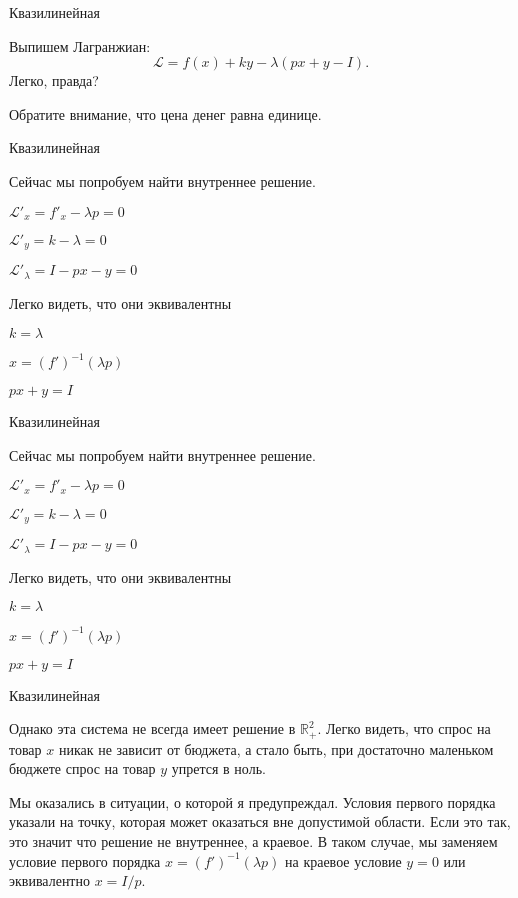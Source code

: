 \documentclass{beamer}
\begin{document}
\begin{frame}{Квазилинейная}

Выпишем Лагранжиан:
$$\mathcal{L} = f(x) + k y - \lambda (px + y - I).$$ 
Легко, правда?

Обратите внимание, что цена денег равна единице.

\end{frame}

\begin{frame}{Квазилинейная}

Сейчас мы попробуем найти внутреннее решение.

$\mathcal{L}'_x = f'_x - \lambda p = 0$

$\mathcal{L}'_y = k - \lambda = 0$

$\mathcal{L}'_{\lambda} = I - p x - y= 0$

Легко видеть, что они эквивалентны

$k = \lambda$

$x = (f')^{-1}(\lambda p)$

$px + y = I$

\end{frame}

\begin{frame}{Квазилинейная}

Сейчас мы попробуем найти внутреннее решение.

$\mathcal{L}'_x = f'_x - \lambda p = 0$

$\mathcal{L}'_y = k - \lambda = 0$

$\mathcal{L}'_{\lambda} = I - p x - y= 0$

Легко видеть, что они эквивалентны

$k = \lambda$

$x = (f')^{-1}(\lambda p)$

$px + y = I$

\end{frame}

\begin{frame}{Квазилинейная}

Однако эта система не всегда имеет решение в $\mathbb{R}^2_{+}$. Легко видеть, что спрос на товар $x$ никак не зависит от бюджета, а стало быть, при достаточно маленьком бюджете спрос на товар $y$ упрется в ноль.

Мы оказались в ситуации, о которой я предупреждал. Условия первого порядка указали на точку, которая может оказаться вне допустимой области. Если это так, это значит что решение не внутреннее, а краевое. В таком случае, мы заменяем условие первого порядка  $x = (f')^{-1}(\lambda p)$ на краевое условие $y=0$ или эквивалентно $x = I/p$.

\end{frame}
\end{document}
